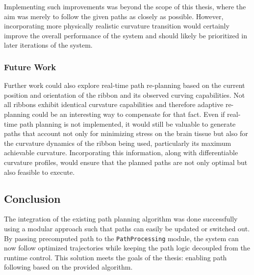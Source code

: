 Implementing such improvements was beyond the scope of this thesis, where the aim was merely to follow the given paths as closely as possible. However, incorporating more physically realistic curvature transition would certainly improve the overall performance of the system and should likely be prioritized in later iterations of the system.


\subsubsection{Future Work}
Further work could also explore real-time path re-planning based on the current position and orientation of the ribbon and its observed curving capabilities. Not all ribbons exhibit identical curvature capabilities and therefore adaptive re-planning could be an interesting way to compensate for that fact.
\newline \newline
Even if real-time path planning is not implemented, it would still be valuable to generate paths that account not only for minimizing stress on the brain tissue but also for the curvature dynamics of the ribbon being used, particularly its maximum achievable curvature. Incorporating this information, along with differentiable curvature profiles, would ensure that the planned paths are not only optimal but also feasible to execute.

\subsection{Conclusion}
The integration of the existing path planning algorithm was done successfully using a modular approach such that paths can easily be updated or switched out. By passing precomputed path to the \texttt{PathProcessing} module, the system can now follow optimized trajectories while keeping the path logic decoupled from the runtime control. This solution meets the goals of the thesis: enabling path following based on the provided algorithm.


